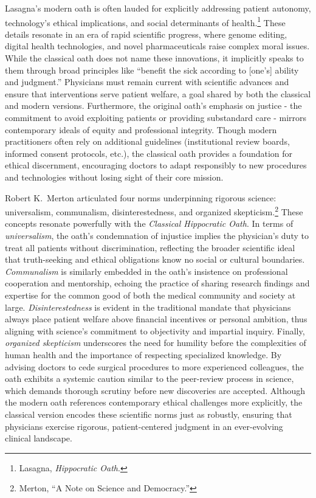 \documentclass[12pt]{article}
\begin{document}
\bigskip

Lasagna’s modern oath is often lauded for explicitly addressing patient autonomy, technology’s ethical implications, 
and social determinants of health.\footnote{Lasagna, \textit{Hippocratic Oath}.} 
These details resonate in an era of rapid scientific progress, where genome editing, digital health technologies, 
and novel pharmaceuticals raise complex moral issues. While the classical oath does not name these innovations, 
it implicitly speaks to them through broad principles like ``benefit the sick according to [one’s] ability and judgment.'' 
Physicians must remain current with scientific advances and ensure that interventions serve patient welfare, 
a goal shared by both the classical and modern versions. Furthermore, the original oath’s emphasis on justice
- the commitment to avoid exploiting patients or providing substandard care - mirrors contemporary ideals of equity and professional integrity. 
Though modern practitioners often rely on additional guidelines (institutional review boards, informed consent protocols, etc.), 
the classical oath provides a foundation for ethical discernment, 
encouraging doctors to adapt responsibly to new procedures and technologies without losing sight of their core mission.

\bigskip

Robert K.\ Merton articulated four norms underpinning rigorous science: universalism, communalism, disinterestedness, and organized skepticism.\footnote{Merton, ``A Note on Science and Democracy.''} These concepts resonate powerfully with the \textit{Classical Hippocratic Oath}. In terms of \textit{universalism}, the oath’s condemnation of injustice implies the physician’s duty to treat all patients without discrimination, reflecting the broader scientific ideal that truth-seeking and ethical obligations know no social or cultural boundaries. \textit{Communalism} is similarly embedded in the oath’s insistence on professional cooperation and mentorship, echoing the practice of sharing research findings and expertise for the common good of both the medical community and society at large. \textit{Disinterestedness} is evident in the traditional mandate that physicians always place patient welfare above financial incentives or personal ambition, thus aligning with science’s commitment to objectivity and impartial inquiry. Finally, \textit{organized skepticism} underscores the need for humility before the complexities of human health and the importance of respecting specialized knowledge. By advising doctors to cede surgical procedures to more experienced colleagues, the oath exhibits a systemic caution similar to the peer-review process in science, which demands thorough scrutiny before new discoveries are accepted. Although the modern oath references contemporary ethical challenges more explicitly, the classical version encodes these scientific norms just as robustly, ensuring that physicians exercise rigorous, patient-centered judgment in an ever-evolving clinical landscape.
\end{document}
